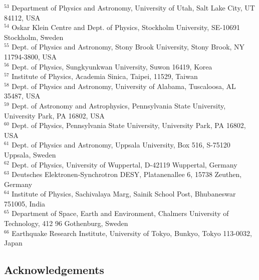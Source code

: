 $^{53}$ Department of Physics and Astronomy, University of Utah, Salt Lake City, UT 84112, USA \\
$^{54}$ Oskar Klein Centre and Dept. of Physics, Stockholm University, SE-10691 Stockholm, Sweden \\
$^{55}$ Dept. of Physics and Astronomy, Stony Brook University, Stony Brook, NY 11794-3800, USA \\
$^{56}$ Dept. of Physics, Sungkyunkwan University, Suwon 16419, Korea \\
$^{57}$ Institute of Physics, Academia Sinica, Taipei, 11529, Taiwan \\
$^{58}$ Dept. of Physics and Astronomy, University of Alabama, Tuscaloosa, AL 35487, USA \\
$^{59}$ Dept. of Astronomy and Astrophysics, Pennsylvania State University, University Park, PA 16802, USA \\
$^{60}$ Dept. of Physics, Pennsylvania State University, University Park, PA 16802, USA \\
$^{61}$ Dept. of Physics and Astronomy, Uppsala University, Box 516, S-75120 Uppsala, Sweden \\
$^{62}$ Dept. of Physics, University of Wuppertal, D-42119 Wuppertal, Germany \\
$^{63}$ Deutsches Elektronen-Synchrotron DESY, Platanenallee 6, 15738 Zeuthen, Germany  \\
$^{64}$ Institute of Physics, Sachivalaya Marg, Sainik School Post, Bhubaneswar 751005, India \\
$^{65}$ Department of Space, Earth and Environment, Chalmers University of Technology, 412 96 Gothenburg, Sweden \\
$^{66}$ Earthquake Research Institute, University of Tokyo, Bunkyo, Tokyo 113-0032, Japan \\

\subsection*{Acknowledgements}

